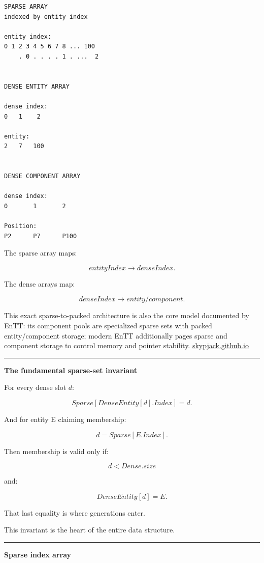 \begin{verbatim}
SPARSE ARRAY
indexed by entity index

entity index:
0 1 2 3 4 5 6 7 8 ... 100
    . 0 . . . . 1 . ...  2


DENSE ENTITY ARRAY

dense index:
0   1    2

entity:
2   7   100


DENSE COMPONENT ARRAY

dense index:
0       1       2

Position:
P2      P7      P100
\end{verbatim}

The sparse array maps:

\[
entityIndex\rightarrow denseIndex.
\]

The dense arrays map:

\[
denseIndex\rightarrow entity/component.
\]

This exact sparse-to-packed architecture is also the core model documented by EnTT: its component pools are specialized sparse sets with packed entity/component storage; modern EnTT additionally pages sparse and component storage to control memory and pointer stability. \href{https://skypjack.github.io/entt/md_docs_2md_2entity.html?utm_source=chatgpt.com}{skypjack.github.io}

\begin{center}\rule{0.5\linewidth}{0.5pt}\end{center}

\textbf{The fundamental sparse-set invariant}

For every dense slot \(d\):

\[
\boxed{
Sparse[DenseEntity[d].Index]=d.
}
\]

And for entity E claiming membership:

\[
d=Sparse[E.Index].
\]

Then membership is valid only if:

\[
d<Dense.size
\]

and:

\[
DenseEntity[d]=E.
\]

That last equality is where generations enter.

This invariant is the heart of the entire data structure.

\begin{center}\rule{0.5\linewidth}{0.5pt}\end{center}

\textbf{Sparse index array}

